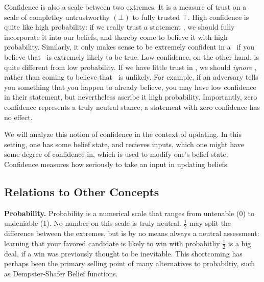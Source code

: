 \documentclass{article}
\begin{document}
Confidence is also a scale between two extremes. It is a measure of trust on a scale of completley untrustworthy $(\bot)$ to fully trusted $\top$. 
High confidence is quite like high probability: if we really trust a statement \stmt, we should fully incorporate it into our beliefs, and thereby come to believe it with high probability. 
Similarly, it only makes sense to be extremely confident in a \stmt\ if you believe that \stmt\ is extremely likely to be true. 
Low confidence, on the other hand, is quite different from low probability. 
If we have little trust in \stmt, we should \emph{ignore} \stmt, rather than coming to believe that \stmt\ is unlikely.
For example, if an adversary tells you something that you happen to already believe, you may have low confidence in their statement, but nevertheless ascribe it high probability. 
Importantly, zero confidence represents a truly neutral stance; a statement with zero confidence has no effect.  

We will analyze this notion of confidence in the context of updating.
In this setting, one has some belief state, and recieves inputs, which one might have some degree of confidence in, which is used to modify one's belief state. 
Confidence measures how seriously to take an input in updating beliefs. 


\subsection{Relations to Other Concepts}

\textbf{Probability.}
Probability is a numerical scale that ranges from untenable (0) to undeniable (1). 
No number on this scale is truly neutral.
$\frac12$ may split the difference between the extremes, but is by no means always a neutral assessment: learning that your favored candidate is likely to win with probabitliy $\frac12$ is a big deal, if a win was previously thought to be inevitable. 
This shortcoming has perhaps been the primary selling point of many alternatives to probabiltiy, such as Dempster-Shafer Belief functions. 
\end{document}
